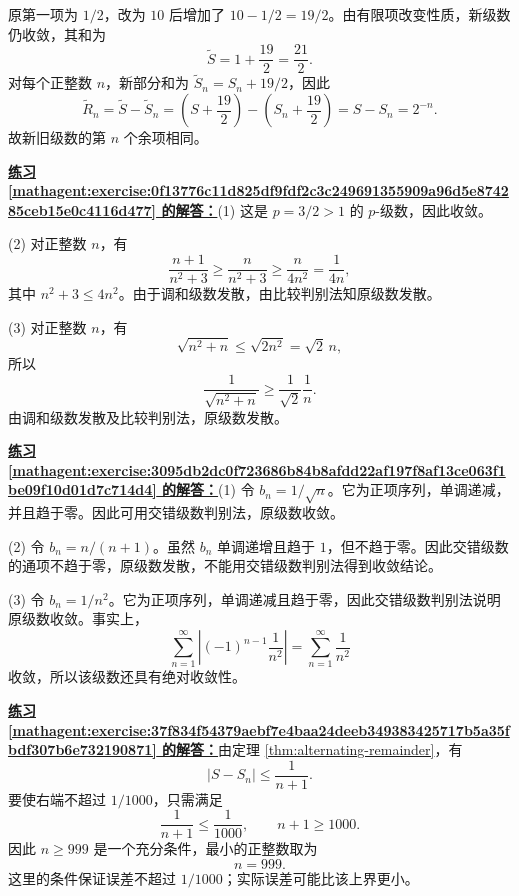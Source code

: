 \documentclass[UTF8,fontset=fandol,11pt]{ctexart}
\begin{document}
原第一项为 $1/2$，改为 $10$ 后增加了 $10-1/2=19/2$。由有限项改变性质，新级数仍收敛，其和为
\[
\widetilde S=1+\frac{19}{2}=\frac{21}{2}.
\]
对每个正整数 $n$，新部分和为 $\widetilde S_n=S_n+19/2$，因此
\[
\widetilde R_n=\widetilde S-\widetilde S_n
=\left(S+\frac{19}{2}\right)-\left(S_n+\frac{19}{2}\right)
=S-S_n=2^{-n}.
\]
故新旧级数的第 $n$ 个余项相同。\par
\par\noindent\textbf{\hyperref[mathagent:exercise:0f13776c11d825df9fdf2c3c249691355909a96d5e874285ceb15e0c4116d477]{练习 \ref*{mathagent:exercise:0f13776c11d825df9fdf2c3c249691355909a96d5e874285ceb15e0c4116d477} 的解答：}}(1) 这是 $p=3/2>1$ 的 $p$-级数，因此收敛。

(2) 对正整数 $n$，有
\[
\frac{n+1}{n^2+3}\geq\frac{n}{n^2+3}\geq\frac{n}{4n^2}=\frac{1}{4n},
\]
其中 $n^2+3\leq4n^2$。由于调和级数发散，由比较判别法知原级数发散。

(3) 对正整数 $n$，有
\[
\sqrt{n^2+n}\leq\sqrt{2n^2}=\sqrt{2}\,n,
\]
所以
\[
\frac{1}{\sqrt{n^2+n}}\geq\frac{1}{\sqrt{2}}\frac{1}{n}.
\]
由调和级数发散及比较判别法，原级数发散。\par
\par\noindent\textbf{\hyperref[mathagent:exercise:3095db2dc0f723686b84b8afdd22af197f8af13ce063f1be09f10d01d7c714d4]{练习 \ref*{mathagent:exercise:3095db2dc0f723686b84b8afdd22af197f8af13ce063f1be09f10d01d7c714d4} 的解答：}}(1) 令 $b_n=1/\sqrt n$。它为正项序列，单调递减，并且趋于零。因此可用交错级数判别法，原级数收敛。

(2) 令 $b_n=n/(n+1)$。虽然 $b_n$ 单调递增且趋于 $1$，但不趋于零。因此交错级数的通项不趋于零，原级数发散，不能用交错级数判别法得到收敛结论。

(3) 令 $b_n=1/n^2$。它为正项序列，单调递减且趋于零，因此交错级数判别法说明原级数收敛。事实上，
\[
\sum_{n=1}^{\infty}\left|(-1)^{n-1}\frac1{n^2}\right|=\sum_{n=1}^{\infty}\frac1{n^2}
\]
收敛，所以该级数还具有绝对收敛性。\par
\par\noindent\textbf{\hyperref[mathagent:exercise:37f834f54379aebf7e4baa24deeb349383425717b5a35fbdf307b6e732190871]{练习 \ref*{mathagent:exercise:37f834f54379aebf7e4baa24deeb349383425717b5a35fbdf307b6e732190871} 的解答：}}由定理 \ref{thm:alternating-remainder}，有
\[
|S-S_n|\leq\frac{1}{n+1}.
\]
要使右端不超过 $1/1000$，只需满足
\[
\frac{1}{n+1}\leq\frac{1}{1000},
\qquad n+1\geq1000.
\]
因此 $n\geq999$ 是一个充分条件，最小的正整数取为
\[
n=999.
\]
这里的条件保证误差不超过 $1/1000$；实际误差可能比该上界更小。\par
\end{document}
